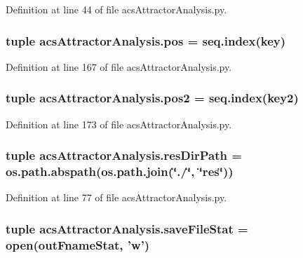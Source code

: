 Definition at line 44 of file acs\+Attractor\+Analysis.\+py.

\hypertarget{a00124_abae060beb170fe923fc10b75f9e82079}{
\subsubsection[{pos}]{\setlength{\rightskip}{0pt plus 5cm}tuple acs\+Attractor\+Analysis.\+pos = {\bf seq.\+index}(key)}}\label{a00124_abae060beb170fe923fc10b75f9e82079}


Definition at line 167 of file acs\+Attractor\+Analysis.\+py.

\hypertarget{a00124_a6ab79d8205f5d0ae2da47fb0af93149a}{
\subsubsection[{pos2}]{\setlength{\rightskip}{0pt plus 5cm}tuple acs\+Attractor\+Analysis.\+pos2 = {\bf seq.\+index}(key2)}}\label{a00124_a6ab79d8205f5d0ae2da47fb0af93149a}


Definition at line 173 of file acs\+Attractor\+Analysis.\+py.

\hypertarget{a00124_a35eb3b681c7408f1476b92798d4f2c16}{
\subsubsection[{res\+Dir\+Path}]{\setlength{\rightskip}{0pt plus 5cm}tuple acs\+Attractor\+Analysis.\+res\+Dir\+Path = os.\+path.\+abspath(os.\+path.\+join(\char`\"{}./\char`\"{}, \char`\"{}res\char`\"{}))}}\label{a00124_a35eb3b681c7408f1476b92798d4f2c16}


Definition at line 77 of file acs\+Attractor\+Analysis.\+py.

\hypertarget{a00124_acc1016f353d0e1b36c837cb0b480edef}{
\subsubsection[{save\+File\+Stat}]{\setlength{\rightskip}{0pt plus 5cm}tuple acs\+Attractor\+Analysis.\+save\+File\+Stat = open({\bf out\+Fname\+Stat}, 'w')}}\label{a00124_acc1016f353d0e1b36c837cb0b480edef}



